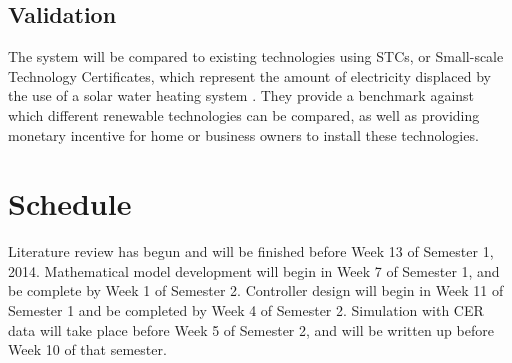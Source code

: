 \documentclass{article}
\begin{document}
\subsection{Validation}

The system will be compared to existing technologies using STCs, or Small-scale
Technology Certificates, which represent the amount of electricity displaced by
the use of a solar water heating system \cite{CER13}. They provide a benchmark
against which different renewable technologies can be compared, as well as
providing monetary incentive for home or business owners to install these
technologies.

\section{Schedule}

Literature review has begun and will be finished before Week 13 of Semester 1, 2014.
Mathematical model development will begin in Week 7 of Semester 1, and be complete
by Week 1 of Semester 2.
Controller design will begin in Week 11 of Semester 1 and be completed by Week 4
of Semester 2.
Simulation with CER data will take place before Week 5 of Semester 2, and will
be written up before Week 10 of that semester.

\clearpage



\end{document}
